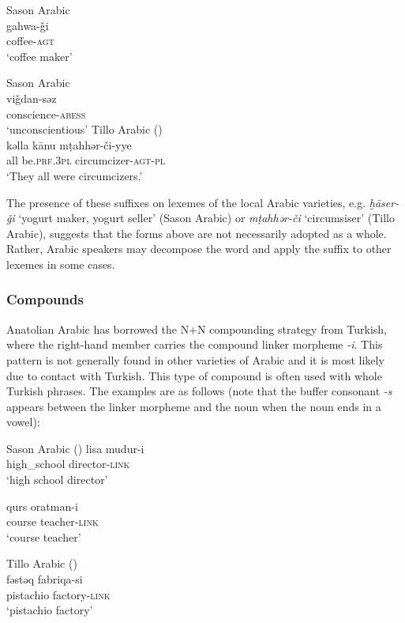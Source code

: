 \documentclass[output=paper]{langsci/langscibook}
\begin{document}
\ea
\ea Sason Arabic 
\\ \gll gahwa-\v{g}i \\
coffee-\textsc{agt}\\
\glt `coffee maker'

\ex Sason Arabic \\
\gll vi\v{g}dan-səz \\
conscience-\textsc{abess}\\
\glt `unconscientious'
\newpage
\ex Tillo Arabic (\citealt[199]{Lahdo2009})\\
\gll kəlla k\={a}nu m\d{t}ahhər-\v{c}i-yye \\
all be.\textsc{prf.3pl} circumcizer-\textsc{agt-pl}\\
\glt  `They all were circumcizers.'
\z
\z


\noindent The presence of these suffixes on lexemes of the local Arabic varieties, e.g. \textit{ḫ\={a}ser-\v{g}i} `yogurt maker, yogurt seller' (Sason Arabic) or \textit{m\d{t}ahhər-\v{c}i} `circumsiser' (Tillo Arabic), suggests that the forms above are not necessarily adopted as a whole. Rather, Arabic speakers may decompose the word and apply the suffix to other lexemes in some cases.

\subsubsection{Compounds}

Anatolian Arabic has borrowed the N+N compounding strategy from Turkish, where the right-hand member carries the compound linker morpheme \textit{-i}. This pattern is not generally found in other varieties of Arabic and it is most likely due to contact with Turkish. This type of compound is  often used with whole Turkish phrases. The examples are as follows (note that the buffer consonant \textit{-s} appears between the linker morpheme and the noun when the noun ends in a vowel):

\ea \label{coms} Sason Arabic (\citealt[41]{AkkusBenmamoun2018})
		\ea \label{com1}\gll lisa		mudur-i\\
    high\_school director-\textsc{link} \\
        \glt `high school director'


	\ex \label{com2} \gll qurs 	oratman-i  \\
        course	teacher-\textsc{link}\\
        \glt `course teacher'
\z
\z
        
      \ea \label{comt} Tillo Arabic (\citealt[199]{Lahdo2009})\\
      \gll fəstəq fabriqa-si \\
        pistachio factory-\textsc{link}\\
        \glt `pistachio factory' 
\z
\end{document}
